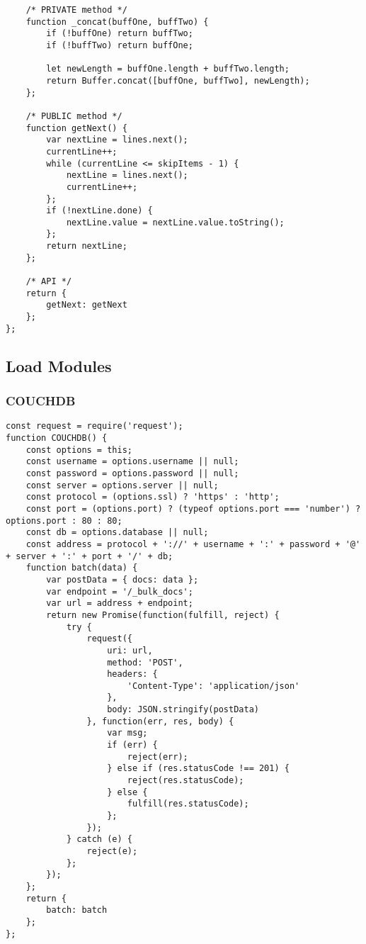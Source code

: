 \begin{verbatim}
    /* PRIVATE method */
    function _concat(buffOne, buffTwo) {
        if (!buffOne) return buffTwo;
        if (!buffTwo) return buffOne;

        let newLength = buffOne.length + buffTwo.length;
        return Buffer.concat([buffOne, buffTwo], newLength);
    };

    /* PUBLIC method */
    function getNext() {
        var nextLine = lines.next();
        currentLine++;
        while (currentLine <= skipItems - 1) {
            nextLine = lines.next();
            currentLine++;
        };
        if (!nextLine.done) {
            nextLine.value = nextLine.value.toString();
        };
        return nextLine;
    };

    /* API */
    return {
        getNext: getNext
    };
};
\end{verbatim}


\subsection{Load Modules}
\subsubsection{COUCHDB}
\label{netl-load-couchdb}
\begin{verbatim}
const request = require('request');
function COUCHDB() {
    const options = this;
    const username = options.username || null;
    const password = options.password || null;
    const server = options.server || null;
    const protocol = (options.ssl) ? 'https' : 'http';
    const port = (options.port) ? (typeof options.port === 'number') ? options.port : 80 : 80;
    const db = options.database || null;
    const address = protocol + '://' + username + ':' + password + '@' + server + ':' + port + '/' + db;
    function batch(data) {
        var postData = { docs: data };
        var endpoint = '/_bulk_docs';
        var url = address + endpoint;
        return new Promise(function(fulfill, reject) {
            try {
                request({
                    uri: url,
                    method: 'POST',
                    headers: {
                        'Content-Type': 'application/json'
                    },
                    body: JSON.stringify(postData)
                }, function(err, res, body) {
                    var msg;
                    if (err) {
                        reject(err);
                    } else if (res.statusCode !== 201) {
                        reject(res.statusCode);
                    } else {
                        fulfill(res.statusCode);
                    };
                });
            } catch (e) {
                reject(e);
            };
        });
    };
    return {
        batch: batch
    };
};
\end{verbatim}

